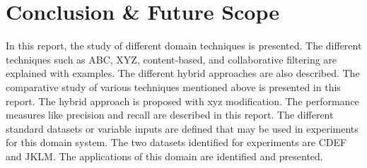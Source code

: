 
\chapter{Conclusion \& Future Scope} \label{chap6}
\newpage

In this report, the study of different domain techniques is presented. The different techniques such as ABC, XYZ, content-based, and collaborative filtering are explained with examples. The different hybrid approaches are also described. The comparative study of various techniques mentioned above is presented in this report. The hybrid approach is proposed with xyz modification. The performance measures like precision and recall are described in this report. The different standard datasets or variable inputs are defined that may be used in experiments for this domain system. The two datasets identified for experiments are CDEF and JKLM. The applications of this domain are identified and presented. 



